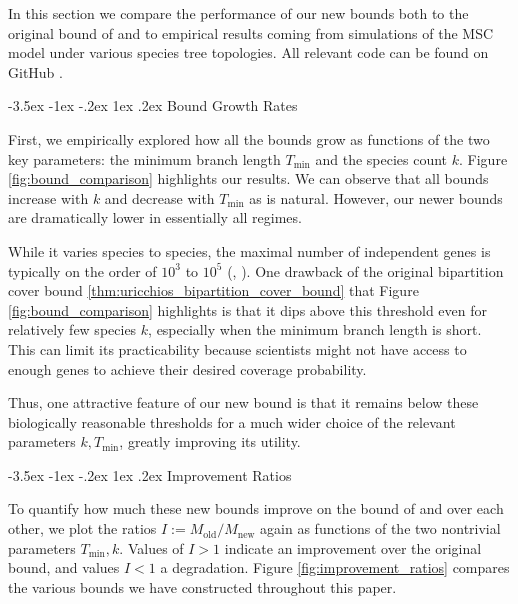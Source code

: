\documentclass[10pt,oneside,reqno]{article}
\makeatletter
\theoremstyle{plain}
\theoremstyle{definition}
\numberwithin{equation}{section}
\def\subsection#1{\@startsection {subsection}{2}{0pt}%
{-3.5ex \@plus -1ex \@minus -.2ex}%
{1ex \@plus.2ex}%
{\bf\mathversion{bold}}{#1}}
\renewcommand{\cite}{\citep}
\makeatother
\begin{document}
In this section we compare the performance of our new bounds both to the original bound of \citet{uricchio2016_bipartition_cover} and to empirical results coming from simulations of the MSC model under various species tree topologies. All relevant code can be found on GitHub \citep{github_page}.  


\subsection{Bound Growth Rates}
\label{sec:bound-growth-rates}

First, we empirically explored how all the bounds grow as functions of the two key parameters: the minimum branch length $T_{\mathrm{min}}$ and the species count $k$.  Figure \ref{fig:bound_comparison} highlights our results. We can observe that all bounds increase with $k$ and decrease with $T_{\mathrm{min}}$ as is natural. However, our newer bounds are dramatically lower in essentially all regimes.

While it varies species to species, the maximal number of independent genes is typically on the order of $10^3$ to $10^5$ (\cite{Loman2012BacterialGenomes}, \cite{Pertea2023HumanGeneCatalogue}). One drawback of the original bipartition cover bound \ref{thm:uricchios_bipartition_cover_bound} that Figure \ref{fig:bound_comparison} highlights is that it dips above this threshold even for relatively few species $k$, especially when the minimum branch length is short. This can limit its practicability because scientists might not have access to enough genes to achieve their desired coverage probability.

Thus, one attractive feature of our new bound is that it remains below these biologically reasonable thresholds for a much wider choice of the relevant parameters $k, T_{\mathrm{min}}$, greatly improving its utility.


\subsection{Improvement Ratios}
\label{sec:improvement-ratios}

To quantify how much these new bounds improve on the bound of \cite{uricchio2016_bipartition_cover} and over each other, we plot the ratios $I := M_{\mathrm{old}}/M_{\mathrm{new}}$ again as functions of the two nontrivial parameters $T_{\mathrm{min}}, k$. Values of $I > 1$ indicate an improvement over the original bound, and values $I < 1$ a degradation. Figure \ref{fig:improvement_ratios} compares the various bounds we have constructed throughout this paper. 
\end{document}
